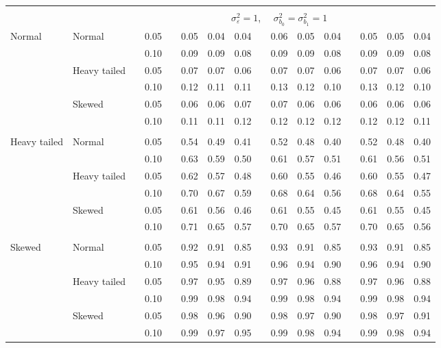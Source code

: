 \begin{table}[ht]
\begin{scriptsize}
\begin{center}
\begin{tabular}{ll p{.1cm} c p{.1cm} rrr p{.1cm} rrr p{.1cm} rrr}
&&&&&&&&&&&&&&&\\
& && && \multicolumn{9}{c}{$\sigma_{\varepsilon}^2 = 1$, \ \ $\sigma_{b_0}^2 = \sigma_{b_1}^2 = 1$} \\ \cline{6-16}

\rowcolor{gray!20}Normal       & Normal       && 0.05 &&   0.05 & 0.04 & 0.04 && 0.06 & 0.05 & 0.04 && 0.05 & 0.05 & 0.04 \\ 
\rowcolor{gray!20}             &              && 0.10 &&   0.09 & 0.09 & 0.08 && 0.09 & 0.09 & 0.08 && 0.09 & 0.09 & 0.08 \\ 
\rowcolor{gray!20}             & Heavy tailed && 0.05 &&   0.07 & 0.07 & 0.06 && 0.07 & 0.07 & 0.06 && 0.07 & 0.07 & 0.06 \\ 
\rowcolor{gray!20}             &              && 0.10 &&   0.12 & 0.11 & 0.11 && 0.13 & 0.12 & 0.10 && 0.13 & 0.12 & 0.10 \\ 
\rowcolor{gray!20}             & Skewed       && 0.05 &&   0.06 & 0.06 & 0.07 && 0.07 & 0.06 & 0.06 && 0.06 & 0.06 & 0.06 \\ 
\rowcolor{gray!20}             &              && 0.10 &&   0.11 & 0.11 & 0.12 && 0.12 & 0.12 & 0.12 && 0.12 & 0.12 & 0.11 \\ 
             &&&&&&&&&&&&&&&\\
Heavy tailed & Normal       && 0.05 &&   0.54 & 0.49 & 0.41 && 0.52 & 0.48 & 0.40 && 0.52 & 0.48 & 0.40 \\ 
             &              && 0.10 &&   0.63 & 0.59 & 0.50 && 0.61 & 0.57 & 0.51 && 0.61 & 0.56 & 0.51 \\ 
             & Heavy tailed && 0.05 &&   0.62 & 0.57 & 0.48 && 0.60 & 0.55 & 0.46 && 0.60 & 0.55 & 0.47 \\ 
             &              && 0.10 &&   0.70 & 0.67 & 0.59 && 0.68 & 0.64 & 0.56 && 0.68 & 0.64 & 0.55 \\ 
             & Skewed       && 0.05 &&   0.61 & 0.56 & 0.46 && 0.61 & 0.55 & 0.45 && 0.61 & 0.55 & 0.45 \\ 
             &              && 0.10 &&   0.71 & 0.65 & 0.57 && 0.70 & 0.65 & 0.57 && 0.70 & 0.65 & 0.56 \\ 
             &&&&&&&&&&&&&&&\\
Skewed       & Normal       && 0.05 &&   0.92 & 0.91 & 0.85 && 0.93 & 0.91 & 0.85 && 0.93 & 0.91 & 0.85 \\ 
             &              && 0.10 &&   0.95 & 0.94 & 0.91 && 0.96 & 0.94 & 0.90 && 0.96 & 0.94 & 0.90 \\ 
             & Heavy tailed && 0.05 &&   0.97 & 0.95 & 0.89 && 0.97 & 0.96 & 0.88 && 0.97 & 0.96 & 0.88 \\ 
             &              && 0.10 &&   0.99 & 0.98 & 0.94 && 0.99 & 0.98 & 0.94 && 0.99 & 0.98 & 0.94 \\ 
             & Skewed       && 0.05 &&   0.98 & 0.96 & 0.90 && 0.98 & 0.97 & 0.90 && 0.98 & 0.97 & 0.91 \\ 
             &              && 0.10 &&   0.99 & 0.97 & 0.95 && 0.99 & 0.98 & 0.94 && 0.99 & 0.98 & 0.94 \\


\end{tabular}
\end{center}
\end{scriptsize}
\end{table}
